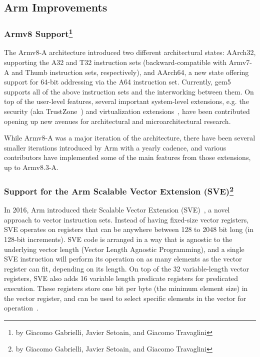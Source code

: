 \subsection[Arm Improvements]{Arm Improvements}
\label{sec:arm}

\subsubsection[Armv8 Support]{Armv8 Support\footnote{by Giacomo Gabrielli, Javier Setoain, and Giacomo Travaglini}}

The Armv8-A architecture introduced two different architectural states:
AArch32, supporting the A32 and T32 instruction sets (backward-compatible with
Armv7-A and Thumb instruction sets, respectively), and AArch64, a new
state offering support for 64-bit addressing via the A64 instruction set. Currently, gem5
supports all of the above instruction sets and the interworking
between them.
On top of the user-level features, several important system-level extensions, e.g. the
security (aka TrustZone~\cite{ArmTustZone}) and virtualization extensions~\cite{ArmARM}, have been contributed opening up new avenues for architectural and microarchitectural research.

While Armv8-A was a major iteration of the architecture, there have been
several smaller iterations introduced by Arm with a yearly cadence, and various
contributors have implemented some of the main features from those extensions,
up to Armv8.3-A.

\subsubsection[Support for the Arm Scalable Vector Extension (SVE)]{Support for the Arm Scalable Vector Extension (SVE)\footnote{by Giacomo Gabrielli, Javier Setoain, and Giacomo Travaglini}}

In 2016, Arm introduced their Scalable Vector Extension (SVE)~\cite{ArmARM}, a
novel approach to vector instruction sets. Instead of having fixed-size vector
registers, SVE operates on registers that can be anywhere between 128 to 2048
bit long (in 128-bit increments). SVE code is arranged in a way that is agnostic to the
underlying vector length (Vector Length Agnostic Programming), and a single SVE
instruction will perform its operation on as many elements as the vector
register can fit, depending on its length. On top of the 32 variable-length
vector registers, SVE also adds 16 variable length predicate registers for
predicated execution. These registers store one bit per byte (the minimum
element size) in the vector register, and can be used to select specific
elements in the vector for operation~\cite{white-paper-on-SVE-and-VLA-programming}.

